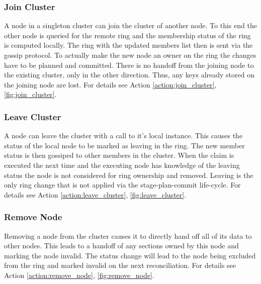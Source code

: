 \subsubsection{Join Cluster}
A node in a singleton cluster can join the cluster of another node.
To this end the other node is queried for the remote ring and the membership status of the ring is computed locally.
The ring with the updated members list then is sent via the gossip protocol.
To actually make the new node an owner on the ring the changes have to be planned and committed.
There is no handoff from the joining node to the existing cluster, only in the other direction.
Thus, any keys already stored on the joining node are lost.
For details see Action \ref{action:join_cluster}, \cref{fig:join_cluster}.

\subsubsection{Leave Cluster}
A node can leave the cluster with a call to it's local instance.
This causes the status of the local node to be marked as leaving in the ring.
The new member status is then gossiped to other members in the cluster.
When the claim is executed the next time and the executing node has knowledge of the leaving status the node is not considered for ring ownership and removed.
Leaving is the only ring change that is not applied via the stage-plan-commit life-cycle.
For details see Action \ref{action:leave_cluster}, \cref{fig:leave_cluster}.

\subsubsection{Remove Node}
Removing a node from the cluster causes it to directly hand off all of its data to other nodes.
This leads to a handoff of any sections owned by this node and marking the node invalid.
The status change will lead to the node being excluded from the ring and marked invalid on the next reconciliation.
For details see Action \ref{action:remove_node}, \cref{fig:remove_node}.

